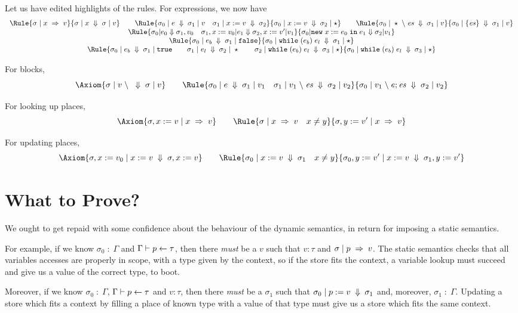 \documentclass{article}
\begin{document}
Let us have edited highlights of the rules. For expressions,
we now have
\[\begin{array}{c}
  \Rule{\JPll\sigma xv}
  {\JEv \sigma x\sigma v}
  \qquad
  \Rule{\JEv{\sigma_0}e{\sigma_1}v\quad
    \JPla{\sigma_1}xv{\sigma_2}}
  {\JEv{\sigma_0}{x\ass v}{\sigma_2}\star}
  \qquad
  \Rule{\JEvs{\sigma_0}\star\es{\sigma_1}v}
  {\JEv{\sigma_0}{\{\es\}}{\sigma_1}v}
  \\
  \Rule{\sigma_0|e_0 \Downarrow \sigma_1, v_0\quad
    \sigma_1,x:=v_0|e_1 \Downarrow \sigma_2,x:=v'|v_1}
    {\sigma_0|\newe x{e_0}{e_1} \Downarrow \sigma_2 | v_1}\\
    \Rule{\JEv{\sigma_0}{e_b}{\sigma_1}\false  }
    {\JEv{\sigma_0}{\whi{e_b}{e_l}}{\sigma_1}{\star}}
\\
    \Rule{\JEv{\sigma_0}{e_b}{\sigma_1}\true \qquad \JEv{\sigma_1}{e_l}{\sigma_2}{\star} \qquad
      \JEv{\sigma_2}{\whi{e_b}{e_l}}{\sigma_3}{\star}  }
    {\JEv{\sigma_0}{\whi{e_b}{e_l}}{\sigma_3}{\star}}
  \end{array}\]

For blocks,
\[
  \Axiom{\JEvs\sigma v{}\sigma v} \qquad
  \Rule{\JEv{\sigma_0}e{\sigma_1}{v_1} \quad
    \JEvs{\sigma_1}{v_1}{\es}{\sigma_2}{v_2}}
  {\JEvs{\sigma_0}{v_1}{e;\es}{\sigma_2}{v_2}}
\]

For looking up places,
\[
  \Axiom{\JPll{\sigma,x:=v}xv} \qquad
  \Rule{\JPll\sigma xv \quad x\neq y}
        {\JPll{\sigma,y:=v'}xv}
\]

For updating places,
\[
  \Axiom{\JPla{\sigma,x:=v_0}xv{\sigma,x:=v}} \qquad
  \Rule{\JPla{\sigma_0}xv{\sigma_1}\quad x\neq y}
       {\JPla{\sigma_0,y:=v'}xv{\sigma_1,y:=v'}}
\]


\section{What to Prove?}

We ought to get repaid with some confidence about the behaviour of the dynamic semantics, in return for imposing a static semantics.

For example, if we know $\sigma_0 \;:\; \Gamma$ and $\Gamma \vdash p \leftarrow \tau$,
then there \emph{must} be a $v$ such that $v : \tau$ and $\sigma \;|\; p \;\Rightarrow\;v$.
The static semantics checks that all variables accesses are properly
in scope, with a type given by the context, so if the store fits the
context, a variable lookup must succeed and give us a value of the correct type, to boot.

Moreover, if we know $\sigma_0 \;:\; \Gamma$, $\Gamma \vdash p \leftarrow \tau$ and
$v : \tau$, then there \emph{must} be a $\sigma_1$ such that
$\sigma_0 \;|\; p\;\mathtt{:=}\; v \;\Downarrow\;\sigma_1$ and, moreover, $\sigma_1\;:\;\Gamma$.
Updating a store which fits a context by filling a place of known type with
a value of that type must give us a store which fits the same context.
\end{document}
